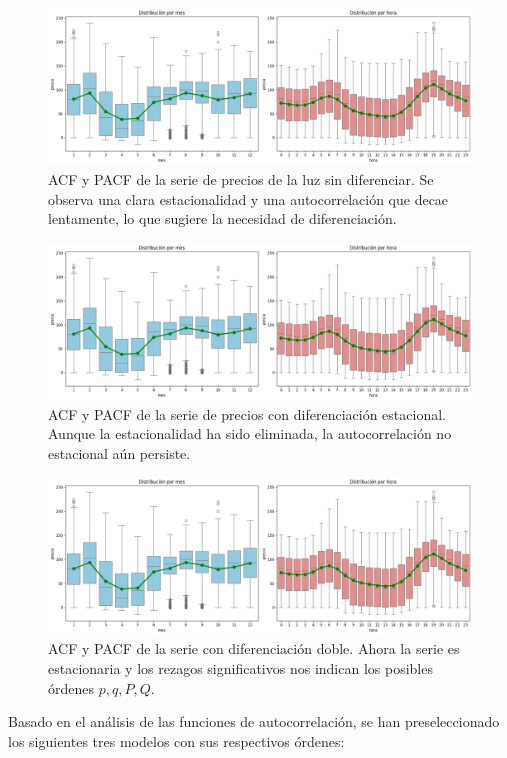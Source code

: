 \begin{figure}[H]
    \centering
    \includegraphics[width=0.7\linewidth]{figuras/boxplots_precios.png}
    \caption[ACF y PACF para d=D=0]{ACF y PACF de la serie de precios de la luz sin diferenciar. Se observa una clara estacionalidad y una autocorrelación que decae lentamente, lo que sugiere la necesidad de diferenciación.}
    \label{fig:ACF_sin_diferenciar}
\end{figure}
\begin{figure}[H]
    \centering
    \includegraphics[width=0.7\linewidth]{figuras/boxplots_precios.png}
    \caption[ACF y PACF para D=1, s=24]{ACF y PACF de la serie de precios con diferenciación estacional. Aunque la estacionalidad ha sido eliminada, la autocorrelación no estacional aún persiste.}
    \label{diferenciado}
\end{figure}
\begin{figure}[H]
    \centering
    \includegraphics[width=0.7\linewidth]{figuras/boxplots_precios.png}
    \caption[ACF y PACF para d=D=1, s=24]{ACF y PACF de la serie con diferenciación doble. Ahora la serie es estacionaria y los rezagos significativos nos indican los posibles órdenes $p, q, P, Q$.}
    \label{dobledifereniado}
\end{figure}

Basado en el análisis de las funciones de autocorrelación, se han preseleccionado los siguientes tres modelos con sus respectivos órdenes:

